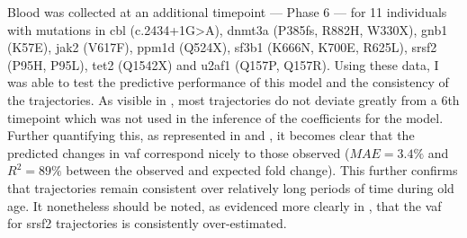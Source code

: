 \begin{figure}[!ht]
	\label{fig:ch-bad-trajectories-examples}
\end{figure}

Blood was collected at an additional timepoint --- Phase 6 --- for 11 individuals with mutations in \ac{cbl} (c.2434+1G>A), \ac{dnmt3a} (P385fs, R882H, W330X), \ac{gnb1} (K57E), \ac{jak2} (V617F), \ac{ppm1d} (Q524X), \ac{sf3b1} (K666N, K700E, R625L), \ac{srsf2} (P95H, P95L), \ac{tet2} (Q1542X) and \ac{u2af1} (Q157P, Q157R). Using these data, I was able to test the predictive performance of this model and the consistency of the trajectories. As visible in , most trajectories do not deviate greatly from a 6th timepoint which was not used in the inference of the coefficients for the model. Further quantifying this, as represented in  and , it becomes clear that the predicted changes in \ac{vaf} correspond nicely to those observed ($MAE = 3.4\%$ and $R^2 = 89\%$ between the observed and expected fold change). This further confirms that trajectories remain consistent over relatively long periods of time during old age. It nonetheless should be noted, as evidenced more clearly in , that the \ac{vaf} for \ac{srsf2} trajectories is consistently over-estimated.

\begin{figure}[!ht]
	\label{fig:trajectories-6th-tp}
\end{figure}

\begin{figure}[!ht]
	\label{fig:performance-6th-tp-2}
\end{figure}

